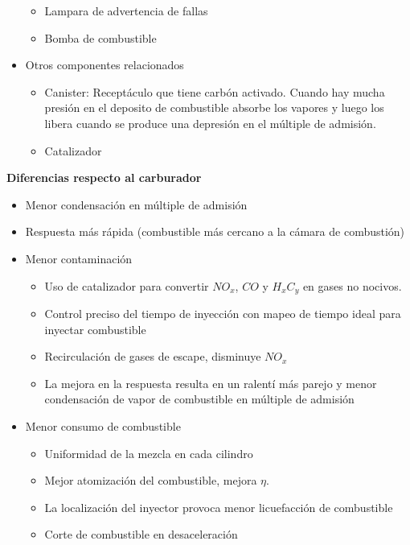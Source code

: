 \begin{itemize}
\begin{itemize}
   \item Lampara de advertencia de fallas
   \item Bomba de combustible
   \end{itemize}
   \item Otros componentes relacionados
   \begin{itemize}
          \item Canister: Receptáculo que tiene carbón activado. Cuando hay mucha presión en el deposito de combustible absorbe los vapores y luego los libera cuando se produce una depresión en el múltiple de admisión.
          \item Catalizador
   \end{itemize}
\end{itemize}

{\bf Diferencias respecto al carburador}

\begin{itemize}
    \item Menor condensación en múltiple de admisión
    \item Respuesta más rápida (combustible más cercano a la cámara de combustión)
    \item Menor contaminación
    \begin{itemize}
        \item Uso de catalizador para convertir $NO_x$, $CO$ y $H_xC_y$ en gases no nocivos.
        \item Control preciso del tiempo de inyección con mapeo de tiempo ideal para inyectar combustible
        \item Recirculación de gases de escape, disminuye $NO_x$
        \item La mejora en la respuesta resulta en un ralentí más parejo y menor condensación de vapor de combustible en múltiple de admisión
    \end{itemize}
    \item Menor consumo de combustible
    \begin{itemize}
        \item Uniformidad de la mezcla en cada cilindro
        \item Mejor atomización del combustible, mejora $\eta$.
        \item La localización del inyector provoca menor licuefacción de combustible
        \item Corte de combustible en desaceleración
    \end{itemize}
    
\end{itemize}

